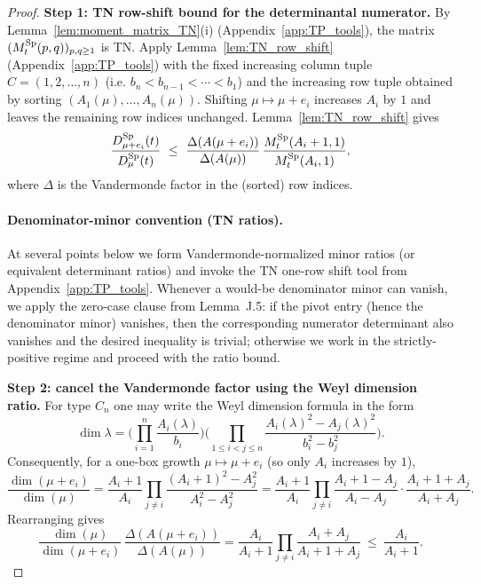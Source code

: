 \begin{proof}
\textbf{Step 1: TN row-shift bound for the determinantal numerator.}
By Lemma~\ref{lem:moment_matrix_TN}(i) (Appendix~\ref{app:TP_tools}), the matrix $(M_t^{\mathrm{Sp}}(p,q))_{p,q\ge 1}$ is TN.
Apply Lemma~\ref{lem:TN_row_shift} (Appendix~\ref{app:TP_tools})
with the fixed increasing column tuple $C=(1,2,\dots,n)$ (i.e. $b_n<b_{n-1}<\cdots<b_1$)
and the increasing row tuple obtained by sorting $(A_1(\mu),\dots,A_n(\mu))$.
Shifting $\mu\mapsto\mu+e_i$ increases $A_i$ by $1$ and leaves the remaining row indices unchanged.
Lemma~\ref{lem:TN_row_shift} gives
\begin{equation}
\label{eq:Sp_det_shift_bound}
\frac{D^{\Sp}_{\mu+e_i}(t)}{D^{\Sp}_{\mu}(t)}
\ \le\ \frac{\Delta(A(\mu+e_i))}{\Delta(A(\mu))}\,\frac{M_t^{\Sp}(A_i+1,1)}{M_t^{\Sp}(A_i,1)},
\end{equation}
where $\Delta$ is the Vandermonde factor in the (sorted) row indices.

\paragraph{Denominator-minor convention (TN ratios).}
At several points below we form Vandermonde-normalized minor ratios (or equivalent determinant ratios) and invoke the TN one-row shift tool from Appendix~\ref{app:TP_tools}.
Whenever a would-be denominator minor can vanish, we apply the zero-case clause from Lemma~J.5:
if the pivot entry (hence the denominator minor) vanishes, then the corresponding numerator determinant also vanishes and the desired inequality is trivial; otherwise we work in the strictly-positive regime and proceed with the ratio bound.




\textbf{Step 2: cancel the Vandermonde factor using the Weyl dimension ratio.}
For type $C_n$ one may write the Weyl dimension formula in the form
\begin{equation}
\label{eq:Sp_dim_formula}
\dim\lambda
=\Bigg(\prod_{i=1}^n \frac{A_i(\lambda)}{b_i}\Bigg)
\Bigg(\prod_{1\le i<j\le n}\frac{A_i(\lambda)^2-A_j(\lambda)^2}{b_i^2-b_j^2}\Bigg).
\end{equation}
Consequently, for a one-box growth $\mu\mapsto\mu+e_i$ (so only $A_i$ increases by $1$),
\begin{equation}
\label{eq:Sp_dim_ratio}
\frac{\dim(\mu+e_i)}{\dim(\mu)}
=\frac{A_i+1}{A_i}\prod_{j\ne i}\frac{(A_i+1)^2-A_j^2}{A_i^2-A_j^2}
=\frac{A_i+1}{A_i}\prod_{j\ne i}\frac{A_i+1-A_j}{A_i-A_j}\cdot\frac{A_i+1+A_j}{A_i+A_j}.
\end{equation}
Rearranging gives
\begin{equation}
\label{eq:Sp_dim_cancel_vandermonde}
\frac{\dim(\mu)}{\dim(\mu+e_i)}\,\frac{\Delta(A(\mu+e_i))}{\Delta(A(\mu))}
=\frac{A_i}{A_i+1}\prod_{j\ne i}\frac{A_i+A_j}{A_i+1+A_j}\ \le\ \frac{A_i}{A_i+1}.
\end{equation}


\end{proof}
